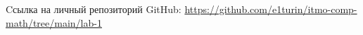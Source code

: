 \begin{thebibliography}{}
 Cсылка на личный репозиторий GitHub: \url{https://github.com/e1turin/itmo-comp-math/tree/main/lab-1}\\
\end{thebibliography}